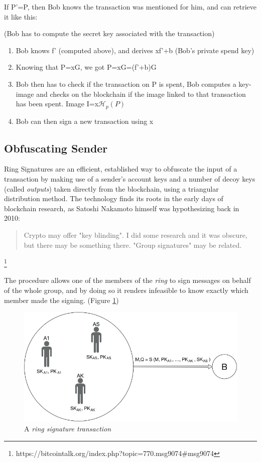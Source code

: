 If P'=P, then Bob knows the transaction was mentioned for him, and can retrieve it like this:

(Bob has to compute the secret key associated with the transaction)

\begin{enumerate}
\item Bob knows f' (computed above), and derives xf'+b  (Bob's private spend key)
\item Knowing that P=xG, we got P=xG=(f'+b)G
\item Bob then has to check if the transaction on P is spent, Bob computes a key-image and checks on the blockchain if the image linked to that transaction has been spent. Image I=x$\mathcal{H}_p(P)$
\item Bob can then sign a new transaction using x
\end{enumerate}

\subsection{Obfuscating Sender}

Ring Signatures are an efficient, established way to obfuscate the input of a transaction by making use of a sender's account keys and a number of decoy keys (called \textit{outputs}) taken directly from the blockchain, using a triangular distribution method. The technology finds its roots in the early days of blockchain research, as Satoshi Nakamoto himself was hypothesizing back in 2010:


\blockquote{Crypto may offer "key blinding". I did some research and it was obscure, but there may be something there. "Group signatures" may be related.} \footnote{https://bitcointalk.org/index.php?topic=770.msg9074\#msg9074}

The procedure allows one of the members of the \textit{ring} to sign messages on behalf of the whole group, and by doing so it renders infeasible to know exactly which member made the signing. (Figure \ref{fig:ringsig})

\begin{figure}
\includegraphics[scale=0.35]{ringsig}
\caption{A \textit{ring signature transaction}}
\label{fig:ringsig}
\end{figure}

